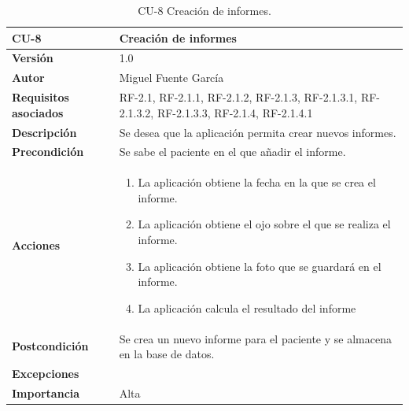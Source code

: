 \begin{table}[p]
	\centering
	\begin{tabularx}{\linewidth}{ p{} p{} }
		\toprule
		\textbf{CU-8}    & \textbf{Creación de informes}\\
		\toprule
		\textbf{Versión}              & 1.0    \\
		\textbf{Autor}                & Miguel Fuente García \\
		\textbf{Requisitos asociados} & RF-2.1, RF-2.1.1, RF-2.1.2, RF-2.1.3, RF-2.1.3.1, RF-2.1.3.2, RF-2.1.3.3, RF-2.1.4, RF-2.1.4.1  \\
		\textbf{Descripción}          & Se desea que la aplicación permita crear nuevos informes. \\
		\textbf{Precondición}         & Se sabe el paciente en el que añadir el informe. \\
		\textbf{Acciones}             &
		\begin{enumerate}
			\def\labelenumi{\arabic{enumi}.}
			\tightlist
			\item La aplicación obtiene la fecha en la que se crea el informe.
            \item La aplicación obtiene el ojo sobre el que se realiza el informe.
            \item La aplicación obtiene la foto que se guardará en el informe.
            \item La aplicación calcula el resultado del informe
            
		\end{enumerate}\\
		\textbf{Postcondición}        & Se crea un nuevo informe para el paciente y se almacena en la base de datos. \\
		\textbf{Excepciones}          &  \\
		\textbf{Importancia}          & Alta  \\
		\bottomrule
	\end{tabularx}
	\caption{CU-8 Creación de informes.}
\end{table}


